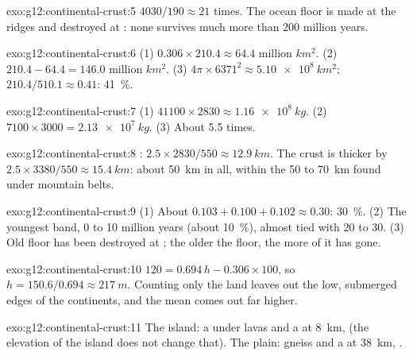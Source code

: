 \begin{solution}{exo:g12:continental-crust:5}
$4030/190 \approx 21$ times. The ocean floor is made at the ridges and
destroyed at : none survives much more than 200 million
years.
\end{solution}

\begin{solution}{exo:g12:continental-crust:6}
(1) $0.306 \times 210.4 \approx \num{64.4}\text{ million }\unit{km^2}$.
(2) $210.4 - 64.4 = \num{146.0}\text{ million }\unit{km^2}$.
(3) $4\pi \times 6371^2 \approx \qty{5.10e8}{km^2}$; $210.4/510.1 \approx
0.41$: \qty{41}{\percent}.
\end{solution}

\begin{solution}{exo:g12:continental-crust:7}
(1) $41100 \times 2830 \approx \qty{1.16e8}{kg}$. (2) $7100 \times 3000 =
\qty{2.13e7}{kg}$. (3) About 5.5 times.
\end{solution}

\begin{solution}{exo:g12:continental-crust:8}
: $2.5 \times 2830/550 \approx \qty{12.9}{km}$. The crust is thicker by
$2.5 \times 3380/550 \approx \qty{15.4}{km}$: about \qty{50}{km} in all,
within the 50 to \qty{70}{km} found under mountain belts.
\end{solution}

\begin{solution}{exo:g12:continental-crust:9}
(1) About $0.103 + 0.100 + 0.102 \approx 0.30$: \qty{30}{\percent}.
(2) The youngest band, 0 to 10 million years (about \qty{10}{\percent}),
almost tied with 20 to 30. (3) Old floor has been destroyed at ; the older the floor, the more of it has gone.
\end{solution}

\begin{solution}{exo:g12:continental-crust:10}
$120 = 0.694\,h - 0.306 \times 100$, so $h = 150.6/0.694 \approx
\qty{217}{m}$. Counting only the land leaves out the low, submerged edges of
the continents, and the mean comes out far higher.
\end{solution}

\begin{solution}{exo:g12:continental-crust:11}
The island: a  under lavas and a  at \qty{8}{km}, 
(the elevation of the island does not change that). The plain: gneiss and a
 at \qty{38}{km}, .
\end{solution}

